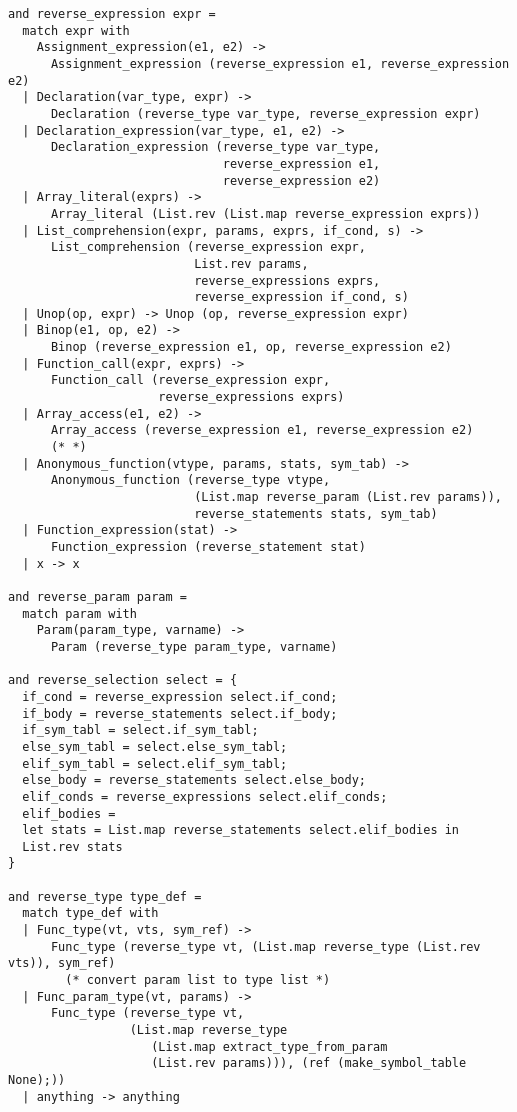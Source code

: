 \begin{verbatim}
and reverse_expression expr =
  match expr with
    Assignment_expression(e1, e2) ->
      Assignment_expression (reverse_expression e1, reverse_expression e2)
  | Declaration(var_type, expr) ->
      Declaration (reverse_type var_type, reverse_expression expr)
  | Declaration_expression(var_type, e1, e2) ->
      Declaration_expression (reverse_type var_type,
                              reverse_expression e1,
                              reverse_expression e2)
  | Array_literal(exprs) ->
      Array_literal (List.rev (List.map reverse_expression exprs))
  | List_comprehension(expr, params, exprs, if_cond, s) ->
      List_comprehension (reverse_expression expr,
                          List.rev params,
                          reverse_expressions exprs,
                          reverse_expression if_cond, s)
  | Unop(op, expr) -> Unop (op, reverse_expression expr)
  | Binop(e1, op, e2) ->
      Binop (reverse_expression e1, op, reverse_expression e2)
  | Function_call(expr, exprs) ->
      Function_call (reverse_expression expr,
                     reverse_expressions exprs)
  | Array_access(e1, e2) ->
      Array_access (reverse_expression e1, reverse_expression e2)
      (* *)
  | Anonymous_function(vtype, params, stats, sym_tab) ->
      Anonymous_function (reverse_type vtype,
                          (List.map reverse_param (List.rev params)),
                          reverse_statements stats, sym_tab)
  | Function_expression(stat) ->
      Function_expression (reverse_statement stat)
  | x -> x

and reverse_param param =
  match param with
    Param(param_type, varname) ->
      Param (reverse_type param_type, varname)

and reverse_selection select = {
  if_cond = reverse_expression select.if_cond;
  if_body = reverse_statements select.if_body;
  if_sym_tabl = select.if_sym_tabl;
  else_sym_tabl = select.else_sym_tabl;
  elif_sym_tabl = select.elif_sym_tabl;
  else_body = reverse_statements select.else_body;
  elif_conds = reverse_expressions select.elif_conds;
  elif_bodies = 
  let stats = List.map reverse_statements select.elif_bodies in
  List.rev stats
}

and reverse_type type_def = 
  match type_def with
  | Func_type(vt, vts, sym_ref) ->
      Func_type (reverse_type vt, (List.map reverse_type (List.rev vts)), sym_ref)
        (* convert param list to type list *)
  | Func_param_type(vt, params) ->
      Func_type (reverse_type vt,
                 (List.map reverse_type
                    (List.map extract_type_from_param
                    (List.rev params))), (ref (make_symbol_table None);))
  | anything -> anything
\end{verbatim}
